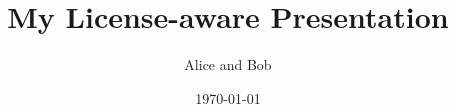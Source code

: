 \documentclass{beamer}
\title{My License-aware Presentation}
\author{Alice and Bob}
\date{\today}
\begin{document}
\begin{frame}
	\titlepage
	\vfill
	\begin{center}
		\\[2.5ex]
		{\tiny\CcNote{\CcLongnameByNcSa}}
		\vspace*{-2.5ex}
	\end{center}
\end{frame}

\end{document}
